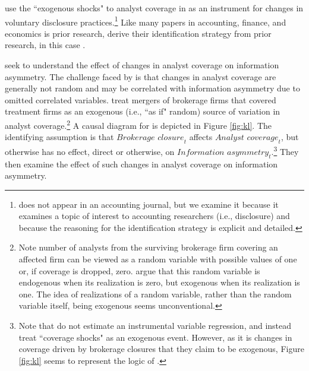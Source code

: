 \documentclass[11pt,reqno,titlepage]{amsart}
\begin{document}
\begin{doublespace}
\citet{Balakrishnan:2014js} use the ``exogenous shocks" to analyst coverage in \citet{Kelly:2012ih} as an instrument for changes in voluntary disclosure practices.\footnote{
\citet{Balakrishnan:2014js} does not appear in an accounting journal, but we examine it because it examines a topic of interest to accounting researchers (i.e., disclosure) and because the reasoning for the identification strategy is explicit and detailed.}
Like many papers in accounting, finance, and economics is prior research, \citet{Balakrishnan:2014js} derive their identification strategy from prior research, in this case  \citet{Kelly:2012ih}.


\citet{Kelly:2012ih} seek to understand the effect of changes in analyst coverage on information asymmetry. 
The challenge faced by \citet{Kelly:2012ih} is that changes in analyst coverage are generally not random and may be correlated with information asymmetry due to omitted correlated variables.
\citet{Kelly:2012ih} treat mergers of brokerage firms that covered treatment firms as an exogenous (i.e., ``as if" random) source of variation in analyst coverage.\footnote{Note number of analysts from the surviving brokerage firm covering an affected firm can be viewed as a random variable with possible values of one or, if coverage is dropped, zero.
\citet{Kelly:2012ih} argue that this random variable is endogenous when its realization is zero, but exogenous when its realization is one. 
The idea of realizations of a random variable, rather than the random variable itself, being exogenous seems unconventional.} 
A causal diagram for \citet{Kelly:2012ih} is depicted in Figure \ref{fig:kl}.
The identifying assumption is that $\textit{Brokerage closure}_t$ affects $\textit{Analyst coverage}_t$, but otherwise has no effect, direct or otherwise, on $\textit{Information asymmetry}_t$.\footnote{
Note that \citet{Kelly:2012ih} do not estimate an instrumental variable regression, and instead treat ``coverage shocks" as an exogenous event. 
However, as it is changes in coverage driven by brokerage closures that they claim to be exogenous, Figure \ref{fig:kl} seems to represent the logic of  \citet{Kelly:2012ih}.}
They then examine the effect of such changes in analyst coverage on information asymmetry.


\end{doublespace}
\end{document}
